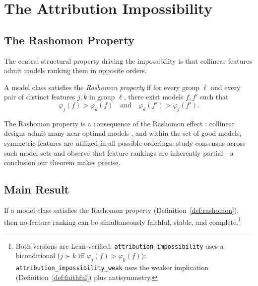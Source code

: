 \documentclass{jmlr}
\begin{document}

\section{The Attribution Impossibility}
\label{sec:impossibility}

\subsection{The Rashomon Property}
\label{sec:rashomon}

The central structural property driving the impossibility is that collinear features admit models ranking them in opposite orders.

\begin{definition}
\label{def:rashomon}
A model class satisfies the \emph{Rashomon property} if for every group $\ell$ and every pair of distinct features $j, k$ in group $\ell$, there exist models $f, f'$ such that
\[
    \varphi_j(f) > \varphi_k(f) \quad \text{and} \quad \varphi_k(f') > \varphi_j(f').
\]
\end{definition}

The Rashomon property is a consequence of the Rashomon effect \citep{rudin2024amazing,fisher2019models}: collinear designs admit many near-optimal models \citep{damour2022underspecification}, and within the set of good models, symmetric features are utilized in all possible orderings.
\citet{laberge2023partial} study consensus across such model sets and observe that feature rankings are inherently partial---a conclusion our theorem makes precise.

\subsection{Main Result}
\label{sec:main-result}

\begin{theorem}
\label{thm:impossibility}
If a model class satisfies the Rashomon property (Definition~\ref{def:rashomon}), then no feature ranking can be simultaneously faithful, stable, and complete.\footnote{Both versions are Lean-verified: \texttt{attribution\_impossibility} uses a biconditional ($j \succ k$ iff $\varphi_j(f) > \varphi_k(f)$); \texttt{attribution\_impossibility\_weak} uses the weaker implication (Definition~\ref{def:faithful}) plus antisymmetry.}
\end{theorem}
\end{document}
